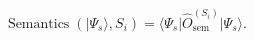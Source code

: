 \documentclass[border=1pt]{standalone}
\begin{document}
\fontsize{18}{22}\selectfont
$\displaystyle \operatorname{Semantics}(\lvert\Psi_s\rangle,S_i)=\langle\Psi_s\rvert\hat{O}^{(S_i)}_{\mathrm{sem}}\lvert\Psi_s\rangle.$
\end{document}
